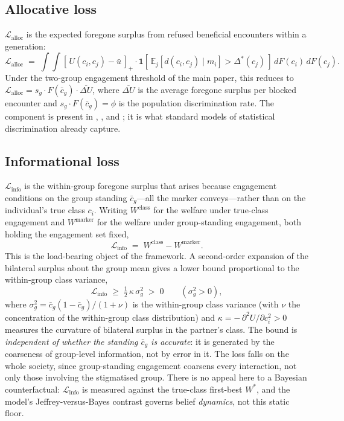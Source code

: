 \documentclass[12pt,a4paper]{article}
\theoremstyle{definition}
\numberwithin{proposition}{section}
\newcommand{\E}{\mathbb{E}}
\begin{document}
\subsection*{Allocative loss}
$\mathcal{L}_{\text{alloc}}$ is the expected foregone surplus from
refused beneficial encounters within a generation:
\begin{equation}
  \mathcal{L}_{\text{alloc}}
  \;=\; \int\!\!\!\int [\,U(c_i, c_j) - \bar{u}\,]_+
  \cdot \mathbf{1}\!\left[\,\E_j[d(c_i, c_j) \mid m_i] > \Delta^*(c_j)\,\right]
  \, dF(c_i)\, dF(c_j).
  \label{eq:L-alloc}
\end{equation}
Under the two-group engagement threshold of the main paper, this
reduces to $\mathcal{L}_{\text{alloc}} = s_g \cdot F(\bar{c}_g) \cdot
\overline{\Delta U}$, where $\overline{\Delta U}$ is the average
foregone surplus per blocked encounter and $s_g \cdot F(\bar{c}_g) = \phi$
is the population discrimination rate. The component is present
in \citet{Phelps1972}, \citet{Arrow1973}, and \citet{Loury2002}; it
is what standard models of statistical discrimination already
capture.

\subsection*{Informational loss}
$\mathcal{L}_{\text{info}}$ is the within-group foregone surplus that
arises because engagement conditions on the group standing
$\bar{c}_g$---all the marker conveys---rather than on the individual's
true class $c_i$. Writing $W^{\mathrm{class}}$ for the welfare under
true-class engagement and $W^{\mathrm{marker}}$ for the welfare under
group-standing engagement, both holding the engagement set fixed,
\begin{equation}
  \mathcal{L}_{\text{info}}
  \;=\; W^{\mathrm{class}} - W^{\mathrm{marker}}.
  \label{eq:L-info}
\end{equation}
This is the load-bearing object of the framework. A second-order
expansion of the bilateral surplus about the group mean gives a lower
bound proportional to the within-group class variance,
\begin{equation}
  \mathcal{L}_{\text{info}}
  \;\geq\; \tfrac{1}{2}\,\kappa\,\sigma^2_g \;>\; 0
  \qquad (\sigma^2_g > 0),
  \label{eq:L-info-bound}
\end{equation}
where $\sigma^2_g = \bar{c}_g(1-\bar{c}_g)/(1+\nu)$ is the within-group
class variance (with $\nu$ the concentration of the within-group class
distribution) and $\kappa = -\,\partial^2 U/\partial c_i^2 > 0$
measures the curvature of bilateral surplus in the partner's class. The
bound is \emph{independent of whether the standing $\bar{c}_g$ is
accurate}: it is generated by the coarseness of group-level
information, not by error in it. The loss falls on the whole society,
since group-standing engagement coarsens every interaction, not only
those involving the stigmatised group. There is no appeal here to a
Bayesian counterfactual: $\mathcal{L}_{\text{info}}$ is measured
against the true-class first-best $W^*$, and the model's
Jeffrey-versus-Bayes contrast governs belief \emph{dynamics}, not this
static floor.
\end{document}

